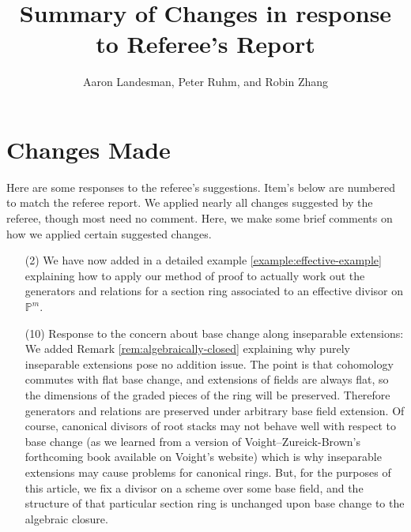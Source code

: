 \documentclass[10 pt]{amsart}
\title{Summary of Changes in response to Referee's Report}
\author{Aaron Landesman, Peter Ruhm, and Robin Zhang}
\theoremstyle{plain}
\theoremstyle{definition}
\theoremstyle{remark}
\numberwithin{equation}{section}
\newcommand\bp{{\mathbb P}}
\begin{document}
\maketitle
\section{Changes Made}
Here are some responses to the referee's suggestions.
Item's below are numbered to match the referee report.
We applied nearly all changes suggested by the referee, though most need no
comment. Here, we make some brief comments on how we applied certain suggested
changes.
\begin{enumerate}
	\item[(2)] 
We have now added in a detailed example 
\autoref{example:effective-example}
explaining how to apply our method of proof to actually work out
the generators and relations for a section ring
associated to an effective divisor on $\bp^m$.
\item[(10)]
Response to the concern about base change along inseparable extensions:
We added Remark \autoref{rem:algebraically-closed}
explaining why purely inseparable extensions pose
no addition issue. The point is that cohomology commutes with flat base change, and extensions of fields
are always flat, so the dimensions of the graded pieces of the ring will be preserved. Therefore generators
and relations are preserved under arbitrary base field extension. Of course,
canonical divisors of root stacks may not behave well with respect to base change (as we learned from a version of Voight--Zureick-Brown's forthcoming book available on Voight's website)
which is why inseparable extensions
may cause problems for canonical rings.
But, for the purposes of this article, we fix a divisor on a scheme over some base field, and the structure of that particular section
ring is unchanged upon base change to the algebraic closure.


\end{enumerate}
\end{document}
